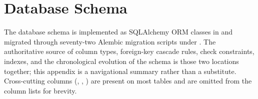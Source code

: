 \chapter{Database Schema}
\label{app:schema}

The \sh{} database schema is implemented as SQLAlchemy ORM classes in  and migrated through seventy-two Alembic migration scripts under . The authoritative source of column types, foreign-key cascade rules, check constraints, indexes, and the chronological evolution of the schema is those two locations together; this appendix is a navigational summary rather than a substitute. Cross-cutting columns (, , ) are present on most tables and are omitted from the column lists for brevity.

